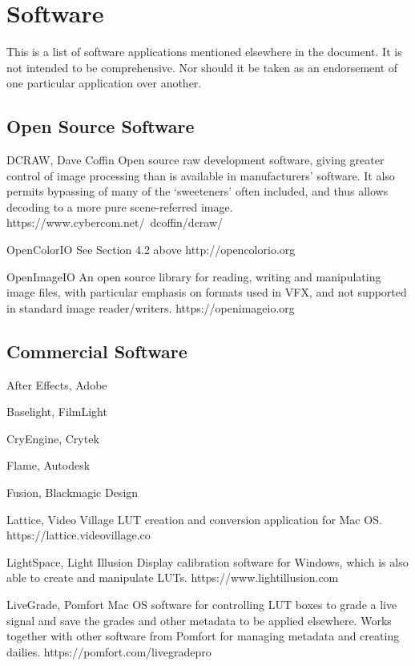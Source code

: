 \section{Software}
\label{sec:software}

This is a list of software applications mentioned elsewhere in the document. It is not intended to be comprehensive. Nor should it be taken as an endorsement of one particular application over another.

\subsection{Open Source Software}
\label{subsec:open-source-software}

DCRAW, Dave Coffin
Open source raw development software, giving greater control of image processing than is available in manufacturers’ software. It also permits bypassing of many of the ‘sweeteners’ often included, and thus allows decoding to a more pure scene-referred image. https://www.cybercom.net/~dcoffin/dcraw/

OpenColorIO
See Section 4.2 above
http://opencolorio.org

OpenImageIO
An open source library for reading, writing and manipulating image files, with particular emphasis on formats used in VFX, and not supported in standard image reader/writers. https://openimageio.org

\subsection{Commercial Software}
\label{subsec:commercial-software}
After Effects, Adobe

Baselight, FilmLight

CryEngine, Crytek

Flame, Autodesk

Fusion, Blackmagic Design

Lattice, Video Village
LUT creation and conversion application for Mac OS. https://lattice.videovillage.co

LightSpace, Light Illusion
Display calibration software for Windows, which is also able to create and manipulate LUTs. https://www.lightillusion.com

LiveGrade, Pomfort
Mac OS software for controlling LUT boxes to grade a live signal and save the grades and other metadata to be applied elsewhere. Works together with other software from Pomfort for managing metadata and creating dailies. https://pomfort.com/livegradepro

